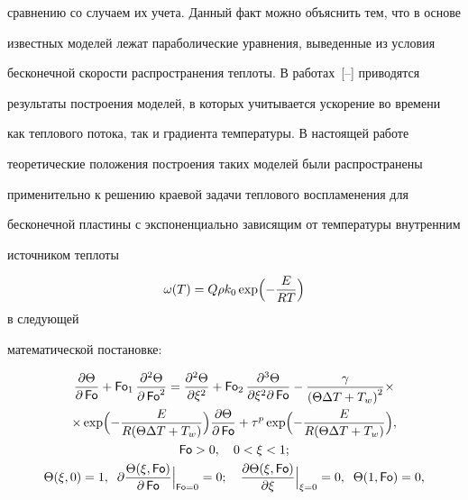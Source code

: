 сравнению со случаем их учета. Данный факт можно объяснить тем, что в основе

известных моделей лежат параболические уравнения, выведенные из условия

бесконечной скорости распространения теплоты. В работах~[--] приводятся

результаты построения моделей, в которых учитывается ускорение во времени

как теплового потока, так и градиента температуры. В настоящей работе

теоретические положения построения таких моделей были распространены

применительно к решению краевой задачи теплового воспламенения для

бесконечной пластины с экспоненциально зависящим от температуры внутренним

источником теплоты 

$$\omega (T)=Q\rho k_0 \exp \Bigl(- \frac{E}{RT} \Bigr)$$ в следующей

математической постановке:

\begin{gather}

\frac{\partial \Theta }{\partial \operatorname{\sf Fo}}+

\operatorname{\sf Fo}_ 1 \frac{\partial^2\Theta }{\partial \operatorname{\sf Fo}^2}=

\frac{\partial ^2\Theta }{\partial \xi ^2}+\operatorname{\sf Fo}_ 2 

\frac{\partial ^3\Theta }{\partial \xi ^2\partial \operatorname{\sf Fo}}-

\frac{\gamma }{\left(\Theta \Delta T+T_{w} \right)^2}\times

\\

\label{kud:eq43}

\times \exp\Bigl( -\frac{E}{R(\Theta \Delta T+T_{w})} \Bigr)

\frac{\partial \Theta}{\partial \operatorname{\sf Fo}}

+

\tau^p \exp\Bigl( -\frac{E}{R(\Theta \Delta T+T_{w})}\Bigr), \\ 

\operatorname{\sf Fo}>0, \quad 0<\xi <1;

\\

\label{kud:eq44}

\Theta (\xi,0)=1,

\;\;

\partial 

\frac{\Theta (\xi,\operatorname{\sf Fo})}{\partial \operatorname{\sf Fo}}\Big|_{\operatorname{\sf Fo}=0} =0;

\quad

\frac{\partial \Theta (\xi,\operatorname{\sf Fo})}{\partial \xi}\Big|_{\xi=0} =0,

\; \;

\Theta (1,\operatorname{\sf Fo})=0,

\end{gather}


